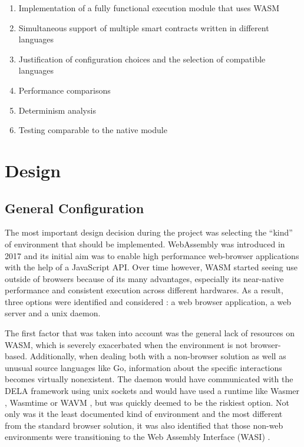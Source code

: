 \documentclass[11pt, a4paper, twoside, openright]{article}
\begin{document}
\begin{enumerate} 

\itemsep0em

 \item Implementation of a fully functional execution module that uses WASM
 \item Simultaneous support of multiple smart contracts written in different languages
 \item Justification of configuration choices and the selection of compatible languages
 \item Performance comparisons
 \item Determinism analysis
 \item Testing comparable to the native module

\end{enumerate} 
\newpage

\section{Design}

\subsection{General Configuration}
The most important design decision during the project was selecting the ``kind'' of environment that should be implemented. WebAssembly was introduced in 2017 and its initial aim was to enable high performance web-browser applications with the help of a JavaScript API. Over time however, WASM started seeing use outside of browsers because of its many advantages, especially its near-native performance and consistent execution across different hardwares. As a result, three options were identified and considered : a web browser application, a web server and a unix daemon.

The first factor that was taken into account was the general lack of resources on WASM, which is severely exacerbated when the environment is not browser-based. Additionally, when dealing both with a non-browser solution as well as unusual source languages like Go, information about the specific interactions becomes virtually nonexistent. The daemon would have communicated with the DELA framework using unix sockets and would have used a runtime like Wasmer \cite{wasmer}, Wasmtime \cite{wasmtime} or WAVM \cite{wavm}, but was quickly deemed to be the riskiest option. Not only was it the least documented kind of environment and the most different from the standard browser solution, it was also identified that those non-web environments were transitioning to the Web Assembly Interface (WASI) \cite{wasi}\cite{announcingwasi}.
\end{document}
